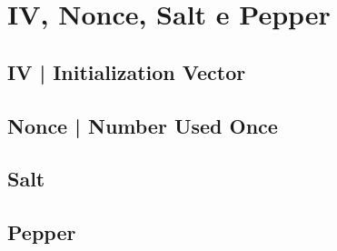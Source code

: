
\textsf{\small }


\section{IV, Nonce, Salt e Pepper} %


\textsf{\small }

\subsection{IV | Initialization Vector} %


\textsf{\small }

\subsection{Nonce | Number Used Once} %


\textsf{\small }

\subsection{Salt} %


\textsf{\small }

\subsection{Pepper} %


\textsf{\small }




